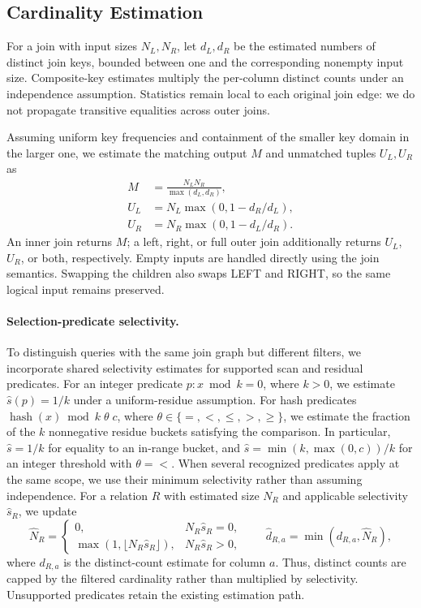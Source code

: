 \subsection{Cardinality Estimation}
\label{sec:cardinality-estimation}

For a join with input sizes $N_L,N_R$, let $d_L,d_R$ be the estimated numbers
of distinct join keys, bounded between one and the corresponding nonempty
input size. Composite-key estimates multiply the per-column distinct counts
under an independence assumption. Statistics remain local to each original
join edge: we do not propagate transitive equalities across outer joins.

Assuming uniform key frequencies and containment of the smaller key domain
in the larger one, we estimate the matching output $M$ and unmatched tuples
$U_L,U_R$ as
\begin{equation}
 \begin{aligned}
 M   &= \frac{N_LN_R}{\max(d_L,d_R)},\\
 U_L &= N_L\max(0,1-d_R/d_L),\\
 U_R &= N_R\max(0,1-d_L/d_R).
 \end{aligned}
 \label{eq:join-cardinality}
\end{equation}
An inner join returns $M$; a left, right, or full outer join additionally
returns $U_L$, $U_R$, or both, respectively. Empty inputs are handled directly
using the join semantics. Swapping the children also swaps LEFT and RIGHT,
so the same logical input remains preserved.

\paragraph{Selection-predicate selectivity.}
To distinguish queries with the same join graph but different filters, we
incorporate shared selectivity estimates for supported scan and residual predicates. For an
integer predicate $p: x \bmod k=0$, where $k>0$, we estimate
$\widehat{s}(p)=1/k$ under a uniform-residue assumption. For hash predicates
$\operatorname{hash}(x)\bmod k\;\theta\;c$, where
$\theta\in\{=,<,\leq,>,\geq\}$, we estimate the fraction of the $k$
nonnegative residue buckets satisfying the comparison. In particular,
$\widehat{s}=1/k$ for equality to an in-range bucket, and
$\widehat{s}=\min(k,\max(0,c))/k$ for an integer threshold with $\theta={<}$.
When several
recognized predicates apply at the same scope, we use their minimum
selectivity rather than assuming independence. For a relation $R$ with
estimated size $N_R$ and applicable selectivity $\widehat{s}_R$, we update
\begin{equation}
 \widehat{N}_R=
 \begin{cases}
  0, & N_R\widehat{s}_R=0,\\
  \max(1,\lfloor N_R\widehat{s}_R\rfloor), & N_R\widehat{s}_R>0,
 \end{cases}
 \qquad
 \widehat{d}_{R,a}=\min(d_{R,a},\widehat{N}_R),
 \label{eq:predicate-selectivity}
\end{equation}
where $d_{R,a}$ is the distinct-count estimate for column $a$. Thus, distinct
counts are capped by the filtered cardinality rather than multiplied by
selectivity. Unsupported predicates retain the existing estimation path.

